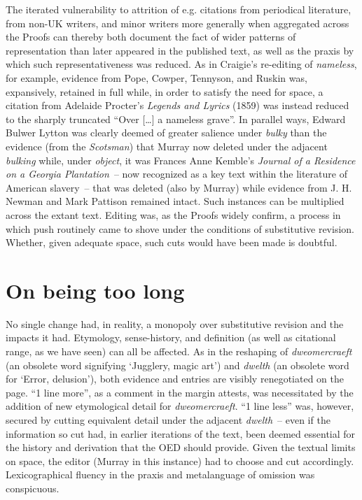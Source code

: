 \documentclass[output=paper,colorlinks,citecolor=brown,arabicfont,chinesefont]{langscibook}
\begin{document}
The iterated vulnerability to attrition of e.g. citations from periodical literature, from non-UK writers, and minor writers more generally when aggregated across the Proofs can thereby both document the fact of wider patterns of representation than later appeared in the published text, as well as the praxis by which such representativeness was reduced. As in Craigie’s re-editing of \emph{nameless}, for example, evidence from Pope, Cowper, Tennyson, and Ruskin was, expansively, retained in full while, in order to satisfy the need for space, a citation from Adelaide Procter’s \emph{Legends and Lyrics} (1859) was instead reduced to the sharply truncated “Over […] a nameless grave”. In parallel ways, Edward Bulwer Lytton was clearly deemed of greater salience under \emph{bulky} than the evidence (from the \emph{Scotsman}) that Murray now deleted under the adjacent \emph{bulking} while, under \emph{object}, it was Frances Anne Kemble’s \emph{Journal of a Residence on a Georgia Plantation}~-- now recognized as a key text within the literature of American slavery~-- that was deleted (also by Murray) while evidence from J. H. Newman and Mark Pattison remained intact. Such instances can be multiplied across the extant text. Editing was, as the Proofs widely confirm, a process in which push routinely came to shove under the conditions of substitutive revision. Whether, given adequate space, such cuts would have been made is doubtful. 

\section{On being too long}

No single change had, in reality, a monopoly over substitutive revision and the impacts it had. Etymology, sense-history, and definition (as well as citational range, as we have seen) can all be affected. As in the reshaping of \emph{dweomercraeft} (an obsolete word signifying ‘Jugglery, magic art’) and \emph{dwelth} (an obsolete word for ‘Error, delusion’), both evidence and entries are visibly renegotiated on the page. “1 line more”, as a comment in the margin attests, was necessitated by the addition of new etymological detail for \emph{dweomercraeft}. “1 line less” was, however, secured by cutting equivalent detail under the adjacent \emph{dwelth}~-- even if the information so cut had, in earlier iterations of the text, been deemed essential for the history and derivation that the OED should provide. Given the textual limits on space, the editor (Murray in this instance) had to choose and cut accordingly. Lexicographical fluency in the praxis and metalanguage of omission was conspicuous.  
\end{document}
